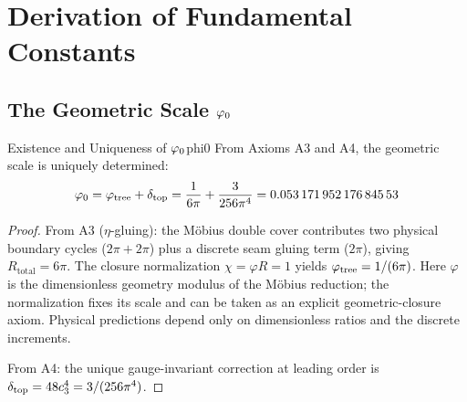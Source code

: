 \section{Derivation of Fundamental Constants}

\subsection{\texorpdfstring{The Geometric Scale $\varphi_0$}{The Geometric Scale phi0}}

\begin{theorem}{Existence and Uniqueness of $\varphi_0$}{phi0}
From Axioms A3 and A4, the geometric scale is uniquely determined:
\begin{equation}
    \phiz = \phitree + \deltatop = \frac{1}{6\pi} + \frac{3}{256\pi^4} = \num[round-mode=places,round-precision=17]{\TFPTvarphiZeroNum}
\end{equation}
\end{theorem}

\begin{proof}
From A3 ($\eta$-gluing): the M\"obius double cover contributes two physical boundary
cycles ($2\pi+2\pi$) plus a discrete seam gluing term ($2\pi$), giving
$R_{\text{total}}=6\pi$. The closure normalization $\chi = \varphi R = 1$
yields $\varphi_{\mathrm{tree}} = 1/(6\pi)$.
Here $\varphi$ is the dimensionless geometry modulus of the M\"obius reduction; the
normalization fixes its scale and can be taken as an explicit geometric-closure axiom.
Physical predictions depend only on dimensionless ratios and the discrete increments.

From A4: the unique gauge-invariant correction at leading order is 
$\delta_{\mathrm{top}} = 48c_3^4 = 3/(256\pi^4)$.
\end{proof}

